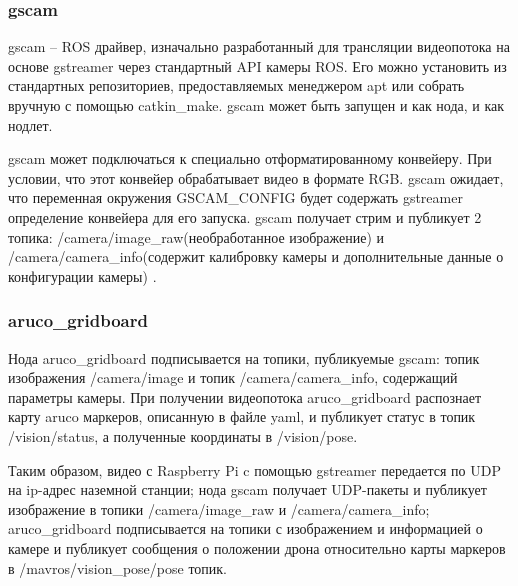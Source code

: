 \subsubsection{gscam}
gscam -- ROS драйвер, изначально разработанный для трансляции видеопотока на основе gstreamer через стандартный API камеры ROS. Его можно установить из стандартных репозиториев, предоставляемых менеджером apt или собрать вручную с помощью catkin\_make. gscam может быть запущен и как нода, и как нодлет.

gscam может подключаться к специально отформатированному конвейеру. При условии, что этот конвейер обрабатывает видео в формате RGB. gscam ожидает, что переменная окружения GSCAM\_CONFIG будет содержать gstreamer определение конвейера для его запуска.
gscam получает стрим и публикует 2 топика: /camera/image\_raw(необработанное изображение) и /camera/camera\_info(содержит калибровку камеры и дополнительные данные о конфигурации камеры) \cite{ros}.

\subsubsection{aruco\_gridboard}
Нода aruco\_gridboard подписывается на топики, публикуемые gscam: топик изображения /camera/image и топик /camera/camera\_info, содержащий параметры камеры. При получении видеопотока aruco\_gridboard распознает карту aruco маркеров, описанную в файле yaml, и публикует статус в топик /vision/status, а полученные координаты в /vision/pose.

Таким образом, видео с Raspberry Pi c помощью gstreamer передается по UDP на ip-адрес наземной станции; нода gscam получает UDP-пакеты и публикует изображение в топики /camera/image\_raw и /camera/camera\_info; aruco\_gridboard подписывается на топики с изображением и информацией о камере и публикует сообщения о положении дрона относительно карты маркеров в /mavros/vision\_pose/pose топик.


